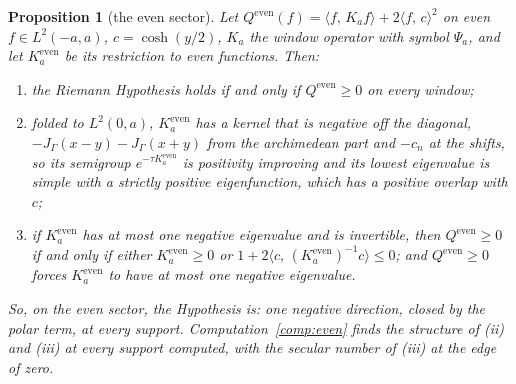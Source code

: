 \documentclass[11pt]{article}
\newtheorem{proposition}[theorem]{Proposition}
\theoremstyle{definition}
\theoremstyle{remark}
\newcommand{\ip}[2]{\langle #1,\, #2\rangle}
\begin{document}
\begin{proposition}[the even sector]\label{prop:even}
Let $Q^{\mathrm{even}}(f)=\ip f{K_af}+2\ip fc^2$ on even $f\in L^2(-a,a)$, $c=\cosh(y/2)$, $K_a$ the window operator with symbol $\Psi_a$, and let $K_a^{\mathrm{even}}$ be its restriction to even functions. Then:
\begin{enumerate}
\item[(i)] the Riemann Hypothesis holds if and only if $Q^{\mathrm{even}}\ge0$ on every window;
\item[(ii)] folded to $L^2(0,a)$, $K_a^{\mathrm{even}}$ has a kernel that is negative off the diagonal, $-J_\Gamma(x-y)-J_\Gamma(x+y)$ from the archimedean part and $-c_n$ at the shifts, so its semigroup $e^{-\tau K_a^{\mathrm{even}}}$ is positivity improving and its lowest eigenvalue is simple with a strictly positive eigenfunction, which has a positive overlap with $c$;
\item[(iii)] if $K_a^{\mathrm{even}}$ has at most one negative eigenvalue and is invertible, then $Q^{\mathrm{even}}\ge0$ if and only if either $K_a^{\mathrm{even}}\ge0$ or $1+2\ip c{(K_a^{\mathrm{even}})^{-1}c}\le0$; and $Q^{\mathrm{even}}\ge0$ forces $K_a^{\mathrm{even}}$ to have at most one negative eigenvalue.
\end{enumerate}
So, on the even sector, the Hypothesis is: one negative direction, closed by the polar term, at every support. Computation~\ref{comp:even} finds the structure of (ii) and (iii) at every support computed, with the secular number of (iii) at the edge of zero.
\end{proposition}
\end{document}
